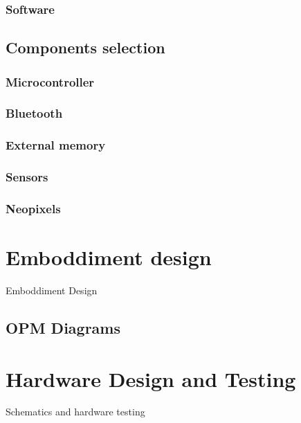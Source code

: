 \subsubsection{Software}
\subsection{Components selection}
\subsubsection{Microcontroller}
\subsubsection{Bluetooth}
\subsubsection{External memory}
\subsubsection{Sensors}
\subsubsection{Neopixels}


\section{Emboddiment design}
Emboddiment Design
\subsection{OPM Diagrams}




\section{Hardware Design and Testing}
Schematics and hardware testing
